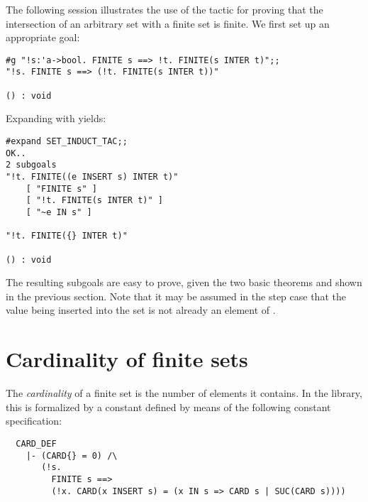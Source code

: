 The following session illustrates the use of the tactic 
for proving that the intersection of an arbitrary set  with a finite set
 is finite.  We first set up an appropriate goal:

\setcounter{sessioncount}{1}
\begin{session}
\begin{verbatim}
#g "!s:'a->bool. FINITE s ==> !t. FINITE(s INTER t)";;
"!s. FINITE s ==> (!t. FINITE(s INTER t))"

() : void
\end{verbatim}\end{session}

\noindent Expanding with  yields:

\begin{session}
\begin{verbatim}
#expand SET_INDUCT_TAC;;
OK..
2 subgoals
"!t. FINITE((e INSERT s) INTER t)"
    [ "FINITE s" ]
    [ "!t. FINITE(s INTER t)" ]
    [ "~e IN s" ]

"!t. FINITE({} INTER t)"

() : void
\end{verbatim}\end{session}

\noindent The resulting subgoals are easy to prove, given the two basic
theorems  and  shown in the previous
section. Note that it may be assumed in the step case that the value 
being inserted into the set  is not already an element of
.%

\section{Cardinality of finite sets}

The {\it cardinality\/} of a finite set is the number of elements it contains.
In the  library, this is formalized by a constant 
defined by means of the following constant specification:

\begin{hol}
\begin{verbatim}
  CARD_DEF
    |- (CARD{} = 0) /\
       (!s.
         FINITE s ==>
         (!x. CARD(x INSERT s) = (x IN s => CARD s | SUC(CARD s))))
\end{verbatim}\end{hol}

